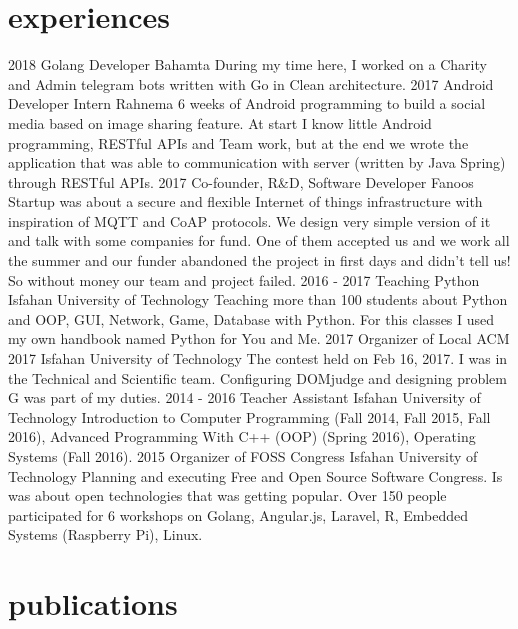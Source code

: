 \documentclass[]{friggeri-cv}
\begin{document}
\section{experiences}

\begin{entrylist}
	\entry
	{2018}
	{Golang Developer}
	{Bahamta}
	{During my time here, I worked on a Charity and Admin telegram bots written with Go in Clean architecture.}
	\entry
	{2017}
	{Android Developer Intern}
	{Rahnema}
	{6 weeks of Android programming to build a social media based on image sharing feature. At start I know little Android programming, RESTful APIs and Team work, but at the end we wrote the application that was able to communication with server (written by Java Spring) through RESTful APIs.}
	\entry
	{2017}
	{Co-founder, R\&D, Software Developer}
	{Fanoos}
	{Startup was about a secure and flexible Internet of things infrastructure with inspiration of MQTT and CoAP protocols. We design very simple version of it and talk with some companies for fund. One of them accepted us and we work all the summer and our funder abandoned the project in first days and didn't tell us! So without money our team and project failed.}
	\entry
	{2016 - 2017}
	{Teaching Python}
	{Isfahan University of Technology}
	{Teaching more than 100 students about Python and OOP, GUI, Network, Game, Database with Python. For this classes I used my own handbook named Python for You and Me.}
	\entry
	{2017}
	{Organizer of Local ACM 2017}
	{Isfahan University of Technology}
	{The contest held on Feb 16, 2017. I was in the Technical and Scientific team. Configuring DOMjudge and designing problem G was part of my duties.}
	\entry
	{2014 - 2016}
	{Teacher Assistant}
	{Isfahan University of Technology}
	{Introduction to Computer Programming (Fall 2014, Fall 2015, Fall 2016),
		Advanced Programming With C++ (OOP) (Spring 2016),
		Operating Systems (Fall 2016).}
	\entry
	{2015}
	{Organizer of FOSS Congress}
	{Isfahan University of Technology}
	{Planning and executing Free and Open Source Software Congress. Is was about open technologies that was getting popular. Over 150 people participated for 6 workshops on Golang, Angular.js, Laravel, R, Embedded Systems (Raspberry Pi), Linux.}
\end{entrylist}

\section{publications}
\end{document}
